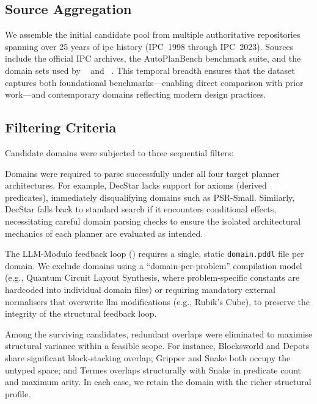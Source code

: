 \subsection{Source Aggregation}

We assemble the initial candidate pool from multiple authoritative repositories spanning over 25 years of \gls{ipc} history (IPC~1998 through IPC~2023).
Sources include the official IPC archives, the AutoPlanBench benchmark suite, and the domain sets used by \citeauthor{Elis2025}~\cite{Elis2025} and \citeauthor{Georgievski2025}~\cite{Georgievski2025}.
This temporal breadth ensures that the dataset captures both foundational benchmarks---enabling direct comparison with prior work---and contemporary domains reflecting modern design practices.

\subsection{Filtering Criteria}

Candidate domains were subjected to three sequential filters:

\begin{description}[style=nextline, leftmargin=1.5cm]
  \item[\textbf{Filter~1} (Syntactic Compatibility):]
    Domains were required to parse successfully under all four target planner architectures.
    For example, DecStar lacks support for axioms (derived predicates), immediately disqualifying domains such as PSR-Small.
    Similarly, DecStar falls back to standard search if it encounters conditional effects, necessitating careful domain parsing checks to ensure the isolated architectural mechanics of each planner are evaluated as intended.

  \item[\textbf{Filter~2} (Pipeline Compatibility):]
    The LLM-Modulo feedback loop () requires a single, static \texttt{domain.pddl} file per domain.
    We exclude domains using a ``domain-per-problem'' compilation model (e.g., Quantum Circuit Layout Synthesis, where problem-specific constants are hardcoded into individual domain files) or requiring mandatory external normalisers that overwrite \gls{llm} modifications (e.g., Rubik's Cube), to preserve the integrity of the structural feedback loop.

  \item[\textbf{Filter~3} (Structural Redundancy Reduction):]
    Among the surviving candidates, redundant overlaps were eliminated to maximise structural variance within a feasible scope.
    For instance, Blocksworld and Depots share significant block-stacking overlap; Gripper and Snake both occupy the untyped space; and Termes overlaps structurally with Snake in predicate count and maximum arity.
    In each case, we retain the domain with the richer structural profile.
\end{description}

